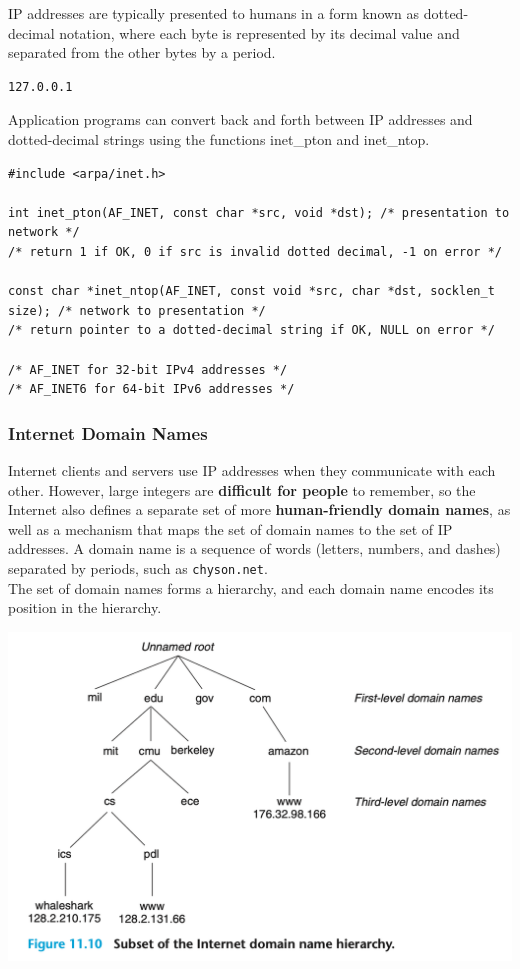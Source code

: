 \documentclass[11pt]{article}
\begin{document}
IP addresses are typically presented to humans in a form known as dotted-decimal notation, where each byte is represented by its decimal value and separated from the other bytes by a period.\\
\begin{verbatim}
127.0.0.1
\end{verbatim}

Application programs can convert back and forth between IP addresses and dotted-decimal strings using the functions inet\_pton and inet\_ntop.\\
\begin{verbatim}
#include <arpa/inet.h>

int inet_pton(AF_INET, const char *src, void *dst); /* presentation to network */
/* return 1 if OK, 0 if src is invalid dotted decimal, -1 on error */

const char *inet_ntop(AF_INET, const void *src, char *dst, socklen_t size); /* network to presentation */
/* return pointer to a dotted-decimal string if OK, NULL on error */

/* AF_INET for 32-bit IPv4 addresses */
/* AF_INET6 for 64-bit IPv6 addresses */

\end{verbatim}


\subsubsection{Internet Domain Names}
\label{sec:org7031e2f}
Internet clients and servers use IP addresses when they communicate with each other. However, large integers are \textbf{difficult for people} to remember, so the Internet also defines a separate set of more \textbf{human-friendly domain names}, as well as a mechanism that maps the set of domain names to the set of IP addresses. A domain name is a sequence of words (letters, numbers, and dashes) separated by periods, such as \texttt{chyson.net}.\\

The set of domain names forms a hierarchy, and each domain name encodes its position in the hierarchy.\\

\begin{center}
\includegraphics[width=.9\linewidth]{pics/figure11.10-domain-name-hierarchy.png}
\end{center}
\end{document}
